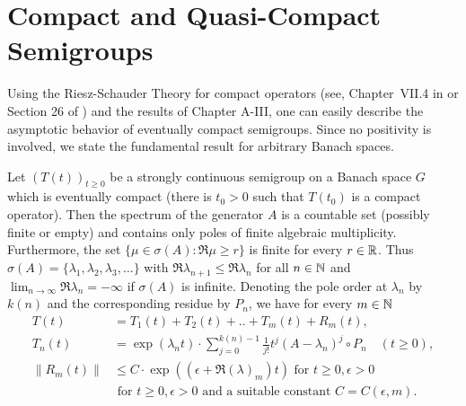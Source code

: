 \section{Compact and Quasi-Compact Semigroups}
\hspace{1cm}{\Large by Günther Greiner}
\vspace{.5cm}
\newline
Using the Riesz-Schauder Theory for compact operators (see, \eg
Chapter~VII.4 in \citet{dunfordschwartz:1958} or Section 26 of \citet{pietsch:1978}) and the results of Chapter A-III, one can easily describe the
asymptotic behavior of eventually compact semigroups.
Since no positivity is involved, we state the fundamental result for arbitrary Banach
spaces.

\begin{theorem}\label{thm:b4-2.1}
Let $(T(t))_{t \geq 0}$ be a strongly continuous semigroup on a Banach space $G$ which is eventually compact (\ie  there is $t_{0} > 0$ such that $T(t_{0})$ is a compact operator).
Then the spectrum of the generator $A$ is a countable set (possibly finite or empty) and contains only poles of finite algebraic multiplicity.
Furthermore, the set $\{\mu \in \sigma(A) \colon \Re \mu \geq r\}$ is finite for every $r \in \mathbb{R}$.
Thus
	$\sigma(A) = \{\lambda_1,\lambda_2,\lambda_3, \ldots \}$ with $\Re \lambda_{n+1} \leq \Re \lambda_n$ for all $n \in \mathbb{N}$ and
	$\lim_{n \to \infty} \Re \lambda_n = -\infty$ if $\sigma(A)$ is infinite.
	Denoting the pole order at $\lambda_n$ by $k(n)$ and the corresponding residue
	by $P_n$, we have for every $m \in \mathbb{N}$
\begin{equation}\label{eq:b4-2.1}
\begin{aligned}
	T(t) &= T_1(t) + T_2(t) + .. + T_m(t) + R_m(t) ,\\
	T_n(t) &= \exp(\lambda_n t) \cdot \sum_{j=0}^{k(n)-1} \frac{1}{j!}t^j(A - \lambda_n)^j \circ P_n 
		\quad (t \geq 0) ,\\
	\|R_m(t)\| & \leq C \cdot \exp((\epsilon +\Re(\lambda)_m)t) \text{ for }  t \geq 0, \epsilon >0\\
			&  \text{ for }  t \geq 0, \epsilon >0  \text{ and a suitable	constant } C=C(\epsilon ,m) .
		\end{aligned}
	\end{equation}
\end{theorem}
